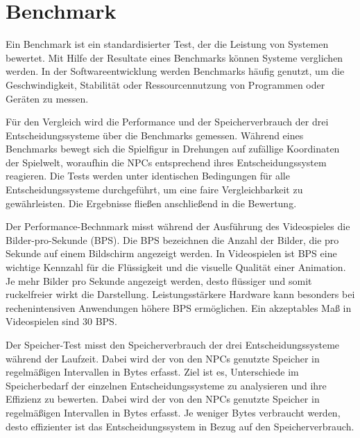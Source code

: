 \section{Benchmark}
\label{chap:benchmark}

Ein Benchmark ist ein standardisierter Test, der die Leistung von Systemen bewertet. Mit Hilfe der Resultate eines Benchmarks k\"{o}nnen Systeme verglichen werden. In der Softwareentwicklung werden Benchmarks h\"{a}ufig genutzt, um die Geschwindigkeit, Stabilit\"{a}t oder Ressourcennutzung von Programmen oder Ger\"{a}ten zu messen.

F\"{u}r den Vergleich wird die Performance und der Speicherverbrauch der drei Entscheidungssysteme \"{u}ber die Benchmarks gemessen. W\"{a}hrend eines Benchmarks bewegt sich die Spielfigur in Drehungen auf zuf\"{a}llige Koordinaten der Spielwelt, woraufhin die NPCs entsprechend ihres Entscheidungssystem reagieren. Die Tests werden unter identischen Bedingungen f\"{u}r alle Entscheidungssysteme durchgef\"{u}hrt, um eine faire Vergleichbarkeit zu gew\"{a}hrleisten. Die Ergebnisse flie\ss{}en anschlie\ss{}end in die Bewertung.

Der Performance-Bechnmark misst w\"{a}hrend der Ausf\"{u}hrung des Videospieles die Bilder-pro-Sekunde (BPS). Die BPS bezeichnen die Anzahl der Bilder, die pro Sekunde auf einem Bildschirm angezeigt werden. In Videospielen ist BPS eine wichtige Kennzahl f\"{u}r die Fl\"{u}ssigkeit und die visuelle Qualit\"{a}t einer Animation. Je mehr Bilder pro Sekunde angezeigt werden, desto fl\"{u}ssiger und somit ruckelfreier wirkt die Darstellung. Leistungsst\"{a}rkere Hardware kann besonders bei rechenintensiven Anwendungen h\"{o}here BPS erm\"{o}glichen. Ein akzeptables Ma\ss{} in Videospielen sind 30 BPS.

Der Speicher-Test misst den Speicherverbrauch der drei Entscheidungssysteme w\"{a}hrend der Laufzeit. Dabei wird der von den NPCs genutzte Speicher in regelm\"{a}\ss{}igen Intervallen in Bytes erfasst. Ziel ist es, Unterschiede im Speicherbedarf der einzelnen Entscheidungssysteme zu analysieren und ihre Effizienz zu bewerten. Dabei wird der von den NPCs genutzte Speicher in regelm\"{a}\ss{}igen Intervallen in Bytes erfasst. Je weniger Bytes verbraucht werden, desto effizienter ist das Entscheidungssystem in Bezug auf den Speicherverbrauch.